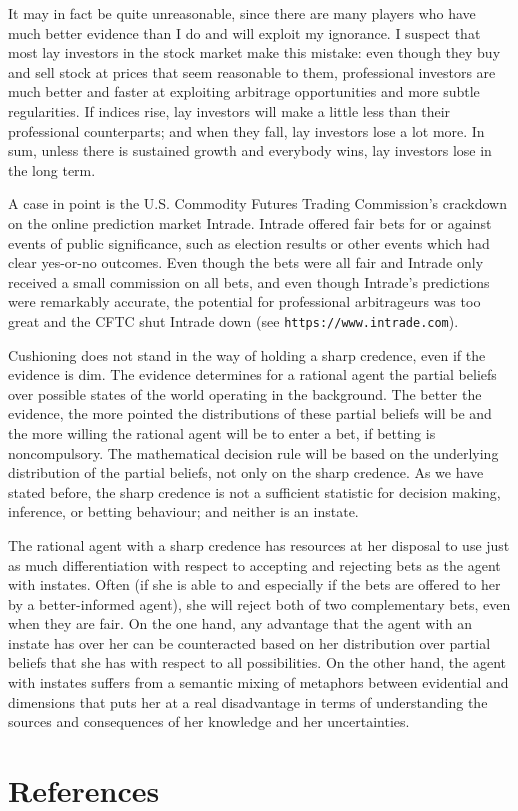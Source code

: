 \documentclass[11pt]{article}
\begin{document}
It may in fact be quite unreasonable, since there are many players who
have much better evidence than I do and will exploit my ignorance. I
suspect that most lay investors in the stock market make this mistake:
even though they buy and sell stock at prices that seem reasonable to
them, professional investors are much better and faster at exploiting
arbitrage opportunities and more subtle regularities. If indices rise,
lay investors will make a little less than their professional
counterparts; and when they fall, lay investors lose a lot more. In
sum, unless there is sustained growth and everybody wins, lay
investors lose in the long term.

A case in point is the U.S. Commodity Futures Trading Commission's
crackdown on the online prediction market Intrade. Intrade offered
fair bets for or against events of public significance, such as
election results or other events which had clear yes-or-no outcomes.
Even though the bets were all fair and Intrade only received a small
commission on all bets, and even though Intrade's predictions were
remarkably accurate, the potential for professional arbitrageurs was
too great and the CFTC shut Intrade down (see
\texttt{https://www.intrade.com}).

Cushioning does not stand in the way of holding a sharp credence, even
if the evidence is dim. The evidence determines for a rational agent
the partial beliefs over possible states of the world operating in the
background. The better the evidence, the more pointed the
distributions of these partial beliefs will be and the more willing
the rational agent will be to enter a bet, if betting is
noncompulsory. The mathematical decision rule will be based on the
underlying distribution of the partial beliefs, not only on the sharp
credence. As we have stated before, the sharp credence is not a
sufficient statistic for decision making, inference, or betting
behaviour; and neither is an instate.

The rational agent with a sharp credence has resources at her disposal
to use just as much differentiation with respect to accepting and
rejecting bets as the agent with instates. Often (if she is able to
and especially if the bets are offered to her by a better-informed
agent), she will reject both of two complementary bets, even when they
are fair. On the one hand, any advantage that the agent with an
instate has over her can be counteracted based on her distribution
over partial beliefs that she has with respect to all possibilities.
On the other hand, the agent with instates suffers from a semantic
mixing of metaphors between evidential and {\doxnotep} dimensions that
puts her at a real disadvantage in terms of understanding the sources
and consequences of her knowledge and her uncertainties.

\section{References}
\label{References}

 

\end{document}
